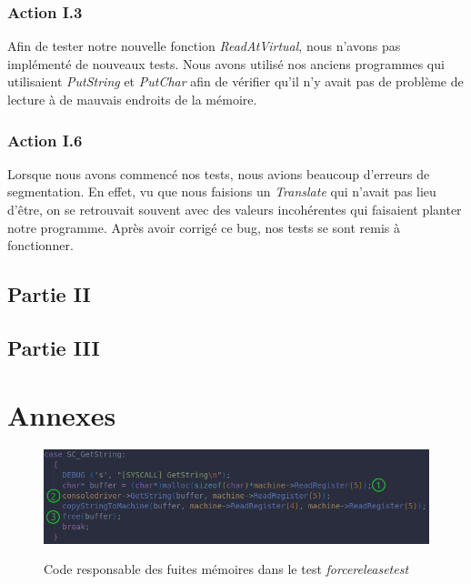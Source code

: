 \documentclass{article}
\begin{document}
\subsubsection{Action I.3}
Afin de tester notre nouvelle fonction \textit{ReadAtVirtual}, nous n'avons pas implémenté de nouveaux tests. Nous avons utilisé nos anciens programmes 
qui utilisaient \textit{PutString} et \textit{PutChar} afin de vérifier qu'il n'y avait pas de problème de lecture à de mauvais endroits de la mémoire.

\subsubsection{Action I.6}
Lorsque nous avons commencé nos tests, nous avions beaucoup d'erreurs de segmentation. En effet, vu que nous faisions un \textit{Translate} qui n'avait pas lieu d'être, on se retrouvait souvent
avec des valeurs incohérentes qui faisaient planter notre programme. Après avoir corrigé ce bug, nos tests se sont remis à fonctionner.

\subsection{Partie II}

\subsection{Partie III}

\section{Annexes}
\begin{figure}[h]
    \caption{Code responsable des fuites mémoires dans le test \textit{forcereleasetest}}
    \centering
    \includegraphics[width=\textwidth,height=\textheight,keepaspectratio]{Leak}
    \label{fig:fuites}
\end{figure}
\end{document}
